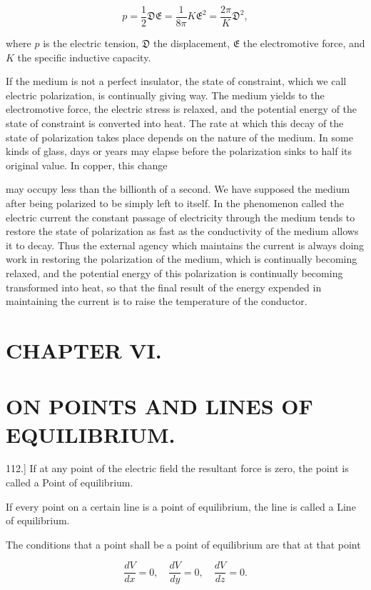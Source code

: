 \documentclass[11pt,a4paper]{article}
\begin{document}
\[
p = \frac{1}{2} \mathfrak{D} \mathfrak{E} = \frac{1}{8\pi} K \mathfrak{E}^2 = \frac{2\pi}{K} \mathfrak{D}^2,
\]

where $p$ is the electric tension, $\mathfrak{D}$ the displacement, $\mathfrak{E}$ the electromotive force, and $K$ the specific inductive capacity.

If the medium is not a perfect insulator, the state of constraint, which we call electric polarization, is continually giving way. The medium yields to the electromotive force, the electric stress is relaxed, and the potential energy of the state of constraint is converted into heat. The rate at which this decay of the state of polarization takes place depends on the nature of the medium. In some kinds of glass, days or years may elapse before the polarization sinks to half its original value. In copper, this change

may occupy less than the billionth of a second. We have supposed the medium after being polarized to be simply left to itself. In the phenomenon called the electric current the constant passage of electricity through the medium tends to restore the state of polarization as fast as the conductivity of the medium allows it to decay. Thus the external agency which maintains the current is always doing work in restoring the polarization of the medium, which is continually becoming relaxed, and the potential energy of this polarization is continually becoming transformed into heat, so that the final result of the energy expended in maintaining the current is to raise the temperature of the conductor.

\section*{CHAPTER VI.}

\section*{ON POINTS AND LINES OF EQUILIBRIUM.}

112.] If at any point of the electric field the resultant force is zero, the point is called a Point of equilibrium.

If every point on a certain line is a point of equilibrium, the line is called a Line of equilibrium.

The conditions that a point shall be a point of equilibrium are that at that point

\[
\frac{dV}{dx}=0,\quad \frac{dV}{dy}=0,\quad \frac{dV}{dz}=0.
\]
\end{document}
